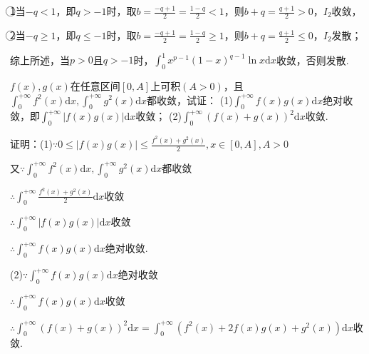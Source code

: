 \documentclass[12pt,UTF8]{ctexart}
\begin{document}
\begin{enumerate}
\textcircled{1}当$-q<1$，即$q>-1$时，取$b=\frac{-q+1}2=\frac{1-q}2<1$，则$b+q=\frac{q+1}2>0$，$I_2$收敛，

\textcircled{2}当$-q\geq1$，即$q\leq-1$时，取$b=\frac{-q+1}2=\frac{1-q}2\geq1$，则$b+q=\frac{q+1}2\leq0$，$I_2$发散；

综上所述，当$p>0$且$q>-1$时，$\int_0^1x^{p-1}(1-x)^{q-1}\ln x\mathrm dx$收敛，否则发散.

$f(x),g(x)$在任意区间$[0,A]$上可积$(A>0)$，且$\int_0^{+\infty}f^2(x)\mathrm dx,\int_0^{+\infty}g^2(x)\mathrm dx$都收敛，试证：
\newline
(1)$\int_0^{+\infty}f(x)g(x)\mathrm dx$绝对收敛，即$\int_0^{+\infty}|f(x)g(x)|\mathrm dx$收敛；
\newline
(2)$\int_0^{+\infty}(f(x)+g(x))^2\mathrm dx$收敛.

证明：(1)$\because0\leq|f(x)g(x)|\leq\frac{f^2(x)+g^2(x)}2,x\in[0,A],A>0$

又$\because\int_0^{+\infty}f^2(x)\mathrm dx,\int_0^{+\infty}g^2(x)\mathrm dx$都收敛

$\therefore\int_0^{+\infty}\frac{f^2(x)+g^2(x)}2\mathrm dx$收敛

$\therefore\int_0^{+\infty}|f(x)g(x)|\mathrm dx$收敛

$\therefore\int_0^{+\infty}f(x)g(x)\mathrm dx$绝对收敛.

(2)$\because\int_0^{+\infty}f(x)g(x)\mathrm dx$绝对收敛

$\therefore\int_0^{+\infty}f(x)g(x)\mathrm dx$收敛

$\therefore\int_0^{+\infty}(f(x)+g(x))^2\mathrm dx=\int_0^{+\infty}(f^2(x)+2f(x)g(x)+g^2(x))\mathrm dx$收敛.
\end{enumerate}
\end{document}
